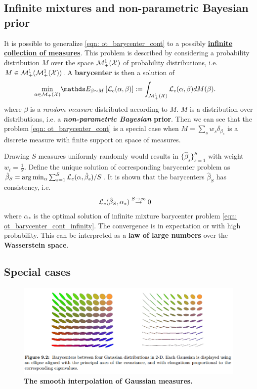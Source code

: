 \documentclass[11pt]{article}
\begin{document}
\subsection{Infinite mixtures and non-parametric Bayesian prior}
It is possible to generalize \eqref{eqn: ot_barycenter_cont} to a possibly \underline{\textbf{infinite collection of measures}}. This problem is described by considering a probability distribution $M$ over the space ${\mathcal M}_{+}^{1}({\mathcal X})$ of probability distributions, i.e. $M \in {\mathcal M}_{+}^{1}({\mathcal M}_{+}^{1}({\mathcal X}))$. A \textbf{barycenter} is then a solution of
\begin{align}
\min_{\alpha \in \cM_{+}(\cX)}& \E{\beta \sim M}{\cL_{c}(\alpha, \beta)} :=  \int_{\cM_{+}^{1}(\cX)}\cL_{c}(\alpha, \beta)dM(\beta). \label{eqn: ot_barycenter_cont_infinity}
\end{align} where $\beta$ is a \emph{random measure} distributed according to $M$.  $M$ is a distribution over distributions, i.e. a \textbf{\emph{non-parametric Bayesian} prior}. Then we can see that the problem \eqref{eqn: ot_barycenter_cont} is a special case when $M = \sum_{s}w_s \delta_{\beta_{s}}$ is a discrete measure with finite support on space of measures. 

Drawing $S$ measures uniformly randomly would results in $\{\hat{\beta}_s\}_{s=1}^{S}$ with weight $w_{i} = \frac{1}{S}$. Define the unique solution of corresponding barycenter problem as $\hat{\beta}_{S} = \arg\min_{\alpha}\sum_{s=1}^{S}{\mathcal L}_{c}(\alpha, \hat{\beta}_{s}) /S$. It is shown that the barycenters $\hat{\beta}_{S}$ has consistency, i.e.
\begin{align*}
{\mathcal L}_{c}(\hat{\beta}_S, \alpha_{*} ) &\stackrel{S \rightarrow \infty}{\rightarrow} 0
\end{align*} where $\alpha_{*}$ is the optimal solution of infinite mixture barycenter problem \eqref{eqn: ot_barycenter_cont_infinity}. The convergence is in expectation or with high probability. This can be interpreted as a \textbf{law of large numbers} over the \textbf{Wasserstein space}. 

\subsection{Special cases}
\begin{figure}
\begin{minipage}[t]{1\linewidth}
  \centering
  \centerline{\includegraphics[scale = 0.45]{barycenter_gaussian.png}}
\end{minipage}
\caption{\footnotesize{\textbf{The smooth interpolation of Gaussian measures.}}}
\label{fig: barycenter_gaussian}
\end{figure}
\end{document}
